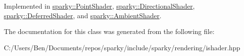 Implemented in \hyperlink{classsparky_1_1_point_shader_a96b31364d736885500c7af9615ed11bd}{sparky\+::\+Point\+Shader}, \hyperlink{classsparky_1_1_directional_shader_ab2776568ee2f03af47daa97ae138d7a0}{sparky\+::\+Directional\+Shader}, \hyperlink{classsparky_1_1_deferred_shader_a664f2316993fab2147c0a34513a5039a}{sparky\+::\+Deferred\+Shader}, and \hyperlink{classsparky_1_1_ambient_shader_a9874223230a47d9f9bd82195e4ed270f}{sparky\+::\+Ambient\+Shader}.



The documentation for this class was generated from the following file\+:\begin{DoxyCompactItemize}
\item 
C\+:/\+Users/\+Ben/\+Documents/repos/sparky/include/sparky/rendering/ishader.\+hpp\end{DoxyCompactItemize}
